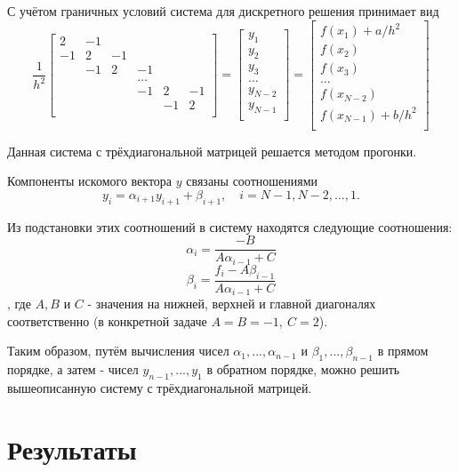 \documentclass{article}
\begin{document}
С учётом граничных условий система для дискретного решения принимает вид
$$\frac{1}{h^2}
\begin{bmatrix}
2 & -1 & & & & \\
-1 & 2 & -1 & & & \\
& -1 & 2 & -1 & & \\
& & & \ldots & & \\
& & & -1 & 2 & -1 \\
& & & & -1 & 2 \\
\end{bmatrix} = \begin{bmatrix}
y_1 \\
y_2 \\ 
y_3 \\
\ldots \\
y_{N-2} \\
y_{N-1} \\
\end{bmatrix} = \begin{bmatrix}
f(x_1) + a / h^2 \\
f(x_2) \\ 
f(x_3) \\
\ldots \\
f(x_{N-2}) \\
f(x_{N-1}) + b / h^2 \\
\end{bmatrix} $$

Данная система с трёхдиагональной матрицей решается методом прогонки.

Компоненты искомого вектора $y$ связаны соотношениями
$$y_i = \alpha_{i+1} y_{i+1} + \beta_{i+1}, \quad i = N-1, N-2, \dots, 1.$$

Из подстановки этих соотношений в систему находятся следующие соотношения:
$$
\alpha_{i} = \frac{-B}{A \alpha_{i - 1} + C}
$$
$$
\beta_{i} = \frac{f_i - A \beta_{i - 1}}{A \alpha_{i - 1} + C}
$$
, где $A, B$ и $C$ - значения на нижней, верхней и главной диагоналях соответственно (в конкретной задаче $A = B = -1, \ C = 2$).

Таким образом, путём вычисления чисел $\alpha_1, ... , \alpha_{n - 1}$ и $\beta_1, ... , \beta_{n - 1}$ в прямом порядке, а затем - чисел $y_{n - 1}, ... , y_1$ в обратном порядке, можно решить вышеописанную систему с трёхдиагональной матрицей.

\section{Результаты}
\end{document}
